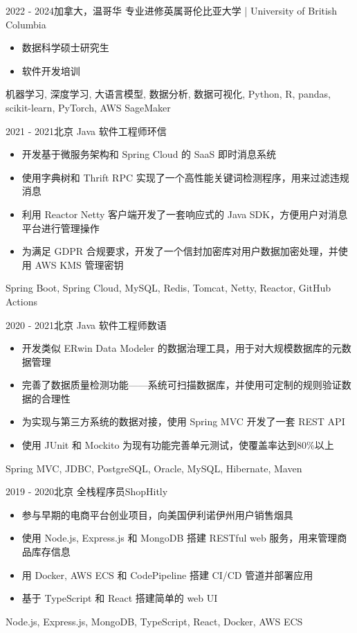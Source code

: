 \begin{experiences}

\experience
{2022 - 2024}{加拿大，温哥华}
{专业进修}{英属哥伦比亚大学 | University of British Columbia}
{
    \begin{itemize}
    \item 数据科学硕士研究生
    \item 软件开发培训
    \end{itemize}
}
{机器学习, 深度学习, 大语言模型, 数据分析, 数据可视化, Python, R, pandas, scikit-learn, PyTorch, AWS SageMaker}

\experience
{2021 - 2021}{北京}
{Java 软件工程师}{环信}
{
    \begin{itemize}
    \item 开发基于微服务架构和 Spring Cloud 的 SaaS 即时消息系统
    \item 使用字典树和 Thrift RPC 实现了一个高性能关键词检测程序，用来过滤违规消息
    \item 利用 Reactor Netty 客户端开发了一套响应式的 Java SDK，方便用户对消息平台进行管理操作
    \item 为满足 GDPR 合规要求，开发了一个信封加密库对用户数据加密处理，并使用 AWS KMS 管理密钥
    \end{itemize}
}
{Spring Boot, Spring Cloud, MySQL, Redis, Tomcat, Netty, Reactor, GitHub Actions}

\experience
{2020 - 2021}{北京}
{Java 软件工程师}{数语}
{
    \begin{itemize}
    \item 开发类似 ERwin Data Modeler 的数据治理工具，用于对大规模数据库的元数据管理
    \item 完善了数据质量检测功能——系统可扫描数据库，并使用可定制的规则验证数据的合理性
    \item 为实现与第三方系统的数据对接，使用 Spring MVC 开发了一套 REST API
    \item 使用 JUnit 和 Mockito 为现有功能完善单元测试，使覆盖率达到80\%以上
    \end{itemize}
}
{Spring MVC, JDBC, PostgreSQL, Oracle, MySQL, Hibernate, Maven}

\experience
{2019 - 2020}{北京}
{全栈程序员}{ShopHitly}
{
    \begin{itemize}
    \item 参与早期的电商平台创业项目，向美国伊利诺伊州用户销售烟具
    \item 使用 Node.js, Express.js 和 MongoDB 搭建 RESTful web 服务，用来管理商品库存信息
    \item 用 Docker, AWS ECS 和 CodePipeline 搭建 CI/CD 管道并部署应用
    \item 基于 TypeScript 和 React 搭建简单的 web UI
    \end{itemize}
}
{Node.js, Express.js, MongoDB, TypeScript, React, Docker, AWS ECS}


\end{experiences}
